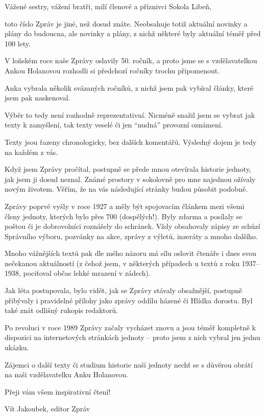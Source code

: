 Vážené sestry, vážení bratři, milí členové a příznivci Sokola Libeň,

toto číslo Zpráv je jiné, než dosud znáte. Neobsahuje totiž aktuální
novinky a plány do budoucna, ale novinky a plány, z nichž některé byly
aktuální téměř před 100 lety.

V loňském roce naše Zprávy oslavily 50. ročník, a proto jsme se s
vzdělavatelkou Ankou Holanovou rozhodli si předchozí ročníky trochu
připomenout.

Anka vybrala několik svázaných ročníků, z nichž jsem pak vybíral články,
které jsem pak naskenoval.

Výběr to tedy není rozhodně reprezentativní. Nicméně snažil jsem se
vybrat jak texty k zamyšlení, tak texty veselé či jen ``nudná'' provozní
oznámení.

Texty jsou řazeny chronologicky, bez dalších komentářů. Výsledný dojem
je tedy na každém z vás.

Když jsem Zprávy pročítal, postupně se přede mnou otevírala historie
jednoty, jak jsem ji dosud neznal. Známé prostory v sokolovně pro mne
najednou ožívaly novým životem. Věřím, že na vás následující stránky
budou působit podobně.

Zprávy poprvé vyšly v roce 1927 a měly být spojovacím článkem mezi všemi
členy jednoty, kterých bylo přes 700 (dospělých!). Byly zdarma a
posílaly se poštou či je dobrovolníci roznášely do schránek. Vždy
obsahovaly zápisy ze schůzí Správního výboru, pozvánky na akce, zprávy z
výletů, inzeráty a mnoho dalšího.

Mnoho vážnějších textů pak dle mého názoru má sílu oslovit čtenáře i
dnes svou nečekanou aktuálností (z čehož jsem, v některých případech u
textů z roku 1937--1938, pociťoval občas lehké mrazení v zádech).

Jak léta postupovala, bylo vidět, jak se Zprávy stávaly obsažnější,
postupně přibývaly i pravidelné přílohy jako zprávy oddílu házené či
Hlídka dorostu. Byl také znát odlišný rukopis redaktorů.

Po revoluci v roce 1989 Zprávy začaly vycházet znovu a jsou téměř
kompletně k dispozici na internetových stránkách jednoty -- proto jsem z
nich vybral jen jednu ukázku.

Zájemci o další texty či studium historie naší jednoty nechť se s
důvěrou obrátí na naši vzdělavatelku Anku Holanovou.

Přeji vám všem inspirativní čtení!

Vít Jakoubek, editor Zpráv

